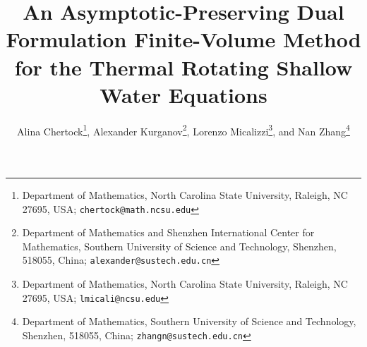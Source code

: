 \documentclass[a4paper,11pt,twoside]{article}
\numberwithin{equation}{section}
\numberwithin{figure}{section}
\numberwithin{table}{section}
\begin{document}
	
\title{An Asymptotic-Preserving Dual Formulation Finite-Volume Method for the Thermal Rotating Shallow Water Equations}
\author{Alina Chertock\thanks{Department of Mathematics, North Carolina State University, Raleigh, NC 27695, USA;
{\tt chertock@math.ncsu.edu}}, Alexander Kurganov\thanks{Department of Mathematics and Shenzhen International Center for Mathematics,
Southern University of Science and Technology, Shenzhen, 518055, China; {\tt alexander@sustech.edu.cn}}, Lorenzo
Micalizzi\thanks{Department of Mathematics, North Carolina State University, Raleigh, NC 27695, USA; {\tt lmicali@ncsu.edu}}, and Nan
Zhang\thanks{Department of Mathematics, Southern University of Science and Technology, Shenzhen, 518055, China;
{\tt zhangn@sustech.edu.cn}}}
\date{}
\maketitle
\end{document}
